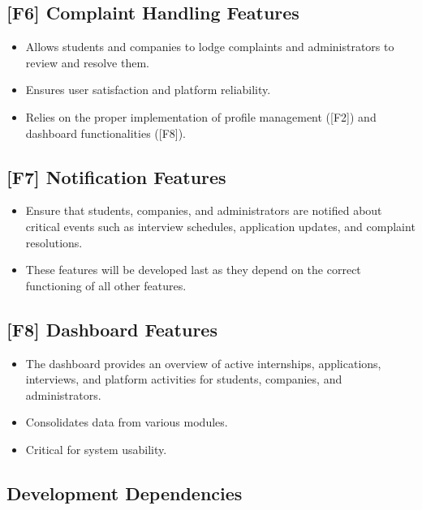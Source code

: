 \subsection{[F6] Complaint Handling Features}
\begin{itemize}
    \item Allows students and companies to lodge complaints and administrators to review and resolve them.
    \item Ensures user satisfaction and platform reliability.
    \item Relies on the proper implementation of profile management ([F2]) and dashboard functionalities ([F8]).
\end{itemize}

\subsection{[F7] Notification Features}
\begin{itemize}
    \item Ensure that students, companies, and administrators are notified about critical events such as interview schedules, application updates, and complaint resolutions.
    \item These features will be developed last as they depend on the correct functioning of all other features.
\end{itemize}

\subsection{[F8] Dashboard Features}
\begin{itemize}
    \item The dashboard provides an overview of active internships, applications, interviews, and platform activities for students, companies, and administrators.
    \item Consolidates data from various modules.
    \item Critical for system usability.
\end{itemize}

\subsection{Development Dependencies}
\label{subsec:development_dependencies}

